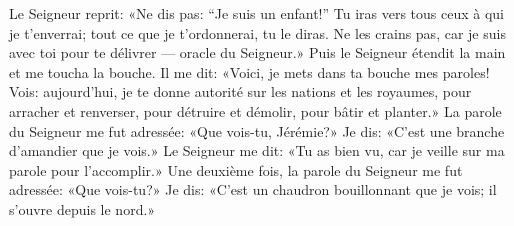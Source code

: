 Le Seigneur reprit: «Ne dis pas: “Je suis un enfant!”
	Tu iras vers tous ceux à qui je t’enverrai;
	tout ce que je t’ordonnerai, tu le diras.
Ne les crains pas, car je suis avec toi pour te délivrer --- oracle du Seigneur.»
Puis le Seigneur étendit la main et me toucha la bouche.
Il me dit:
	«Voici, je mets dans ta bouche mes paroles!
	Vois: aujourd’hui, je te donne autorité sur les nations et les royaumes,
	pour arracher et renverser, pour détruire et démolir,
		pour bâtir et planter.»
La parole du Seigneur me fut adressée:
	«Que vois-tu, Jérémie?»
	Je dis: «C’est une branche d’amandier que je vois.»
Le Seigneur me dit:
	«Tu as bien vu, car je veille sur ma parole pour l’accomplir.»
Une deuxième fois, la parole du Seigneur me fut adressée:
	«Que vois-tu?»
	Je dis: «C’est un chaudron bouillonnant que je vois;
	il s’ouvre depuis le nord.»

